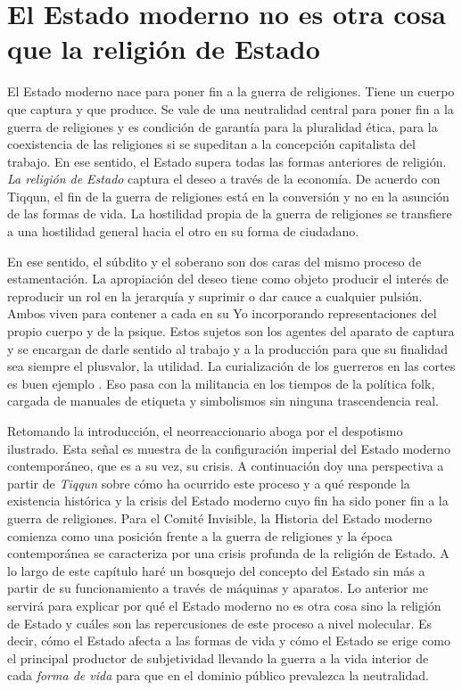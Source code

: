 \chapter{El Estado moderno no es otra cosa que la religión de Estado}
\label{cha:el-estado-moderno}

El Estado moderno nace para poner fin a la guerra de religiones. Tiene un cuerpo que captura y que produce. Se vale de una neutralidad central para poner fin a la guerra de religiones y es condición de garantía para la pluralidad ética, para la coexistencia de las religiones si se supeditan a la concepción capitalista del trabajo. En ese sentido, el Estado supera todas las formas anteriores de religión. \emph{La religión de Estado} captura el deseo a través de la economía. De acuerdo con Tiqqun, el fin de la guerra de religiones está en la conversión y no en la asunción de las formas de vida. La hostilidad propia de la guerra de religiones se transfiere a una hostilidad general hacia el otro en su forma de ciudadano.

En ese sentido, el súbdito y el soberano son dos caras del mismo proceso de estamentación. La apropiación del deseo tiene como objeto producir el interés de reproducir un rol en la jerarquía y suprimir o dar cauce a cualquier pulsión. Ambos viven para contener a cada  en su Yo incorporando representaciones del propio cuerpo y de la psique. Estos sujetos son los agentes del aparato de captura y se encargan de darle sentido al trabajo y a la producción para que su finalidad sea siempre el plusvalor, la utilidad. La curialización de los guerreros en las cortes es buen ejemplo \autocite{tiqqunIntroduccionGuerraCivil2008}. Eso pasa con la militancia en los tiempos de la política folk, cargada de manuales de etiqueta y simbolismos sin ninguna trascendencia real.

Retomando la introducción, el neorreaccionario aboga por el despotismo ilustrado. Esta señal es muestra de la configuración imperial del Estado moderno contemporáneo, que es a su vez, su crisis. A continuación doy una perspectiva a partir de \emph{Tiqqun} sobre cómo ha ocurrido este proceso y a qué responde la existencia histórica y la crisis del Estado moderno cuyo fin ha sido poner fin a la guerra de religiones. Para el Comité Invisible, la Historia del Estado moderno comienza como una posición frente a la guerra de religiones y la época contemporánea se caracteriza por una crisis profunda de la religión de Estado. A lo largo de este capítulo haré un bosquejo del concepto del Estado sin más a partir de su funcionamiento a través de máquinas y aparatos. Lo anterior me servirá para explicar por qué el Estado moderno no es otra cosa sino la religión de Estado y cuáles son las repercusiones de este proceso a nivel molecular. Es decir, cómo el Estado afecta a las formas de vida y cómo el Estado se erige como el principal productor de subjetividad llevando la guerra a la vida interior de cada \emph{forma de vida} para que en el dominio público prevalezca la neutralidad.

